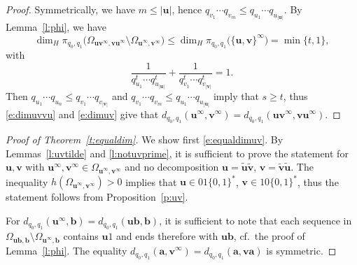 \documentclass{amsart}
\theoremstyle{definition}
\numberwithin{equation}{section}
\newcommand{\ba}{\mathbf{a}}
\newcommand{\bb}{\mathbf{b}}
\newcommand{\bu}{\mathbf{u}}
\newcommand{\bv}{\mathbf{v}}
\begin{document}
\begin{proof}
Symmetrically, we have $m \le |\bu|$, hence $q_{v_1} \cdots q_{v_m} \le q_{u_1} \cdots q_{u_{|\bu|}}$.
By Lemma~\ref{l:phi}, we have 
\begin{equation} \label{e:dimuvvu}
\dim_H \pi_{q_0,q_1}\big(\Omega_{\bu\bv^\infty,\bv\bu^\infty} \setminus \Omega_{\bu^\infty,\bv^\infty}\big) \le \dim_H \pi_{q_0,q_1}\big(\{\bu,\bv\}^\infty\big) = \min\{t,1\}, 
\end{equation}
with
\[
\frac{1}{q_{u_1}^t\cdots q_{u_{|\bu|}}^t} + \frac{1}{q_{v_1}^t\cdots q_{v_{|\bv|}}^t} = 1.
\]
Then $q_{u_1} \cdots q_{u_n} \le q_{v_1} \cdots q_{v_{|\bv|}}$ and $q_{v_1} \cdots q_{v_m} \le q_{u_1} \cdots q_{u_{|\bu|}}$ imply that $s \ge t$, thus \eqref{e:dimuvvu} and \eqref{e:dimuv} give that  $d_{q_0,q_1}(\bu^\infty,\bv^\infty) = d_{q_0,q_1}(\bu\bv^\infty,\bv\bu^\infty)$.
\end{proof}

\begin{proof}[Proof of Theorem~\ref{t:equaldim}]
We show first \eqref{e:equaldimuv}.
By Lemmas~\ref{l:uvtilde} and \ref{l:notuvprime}, it is sufficient to prove the statement for $\bu,\bv$ with $\bu^\infty, \bv^\infty \in \Omega_{\bu^\infty,\bv^\infty}$ and no decomposition $\bu = \tilde{\bu}\tilde{\bv}$, $\bv = \tilde{\bv}\tilde{\bu}$.
The inequality $h(\Omega_{\bu^\infty,\bv^\infty}) > 0$ implies that $\bu \in 01\{0,1\}^*$, $\bv \in 10\{0,1\}^*$, thus the statement follows from Proposition~\ref{p:uv}.

For $d_{q_0,q_1}(\bu^\infty,\bb) = d_{q_0,q_1}(\bu\bb,\bb)$, it is sufficient to note that each sequence in $\Omega_{\bu\bb,\bb} \setminus \Omega_{\bu^\infty,\bb}$ contains $\bu 1$ and ends therefore with $\bu \bb$, cf.\ the proof of Lemma~\ref{l:phi}.
The equality $d_{q_0,q_1}(\ba,\bv^\infty) = d_{q_0,q_1}(\ba,\bv\ba)$ is symmetric.
\end{proof}
\end{document}
